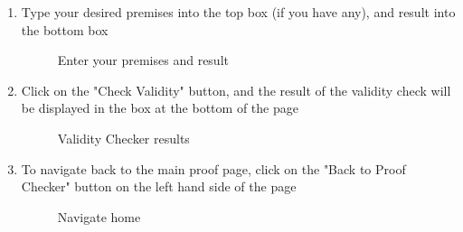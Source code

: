 \begin{enumerate}
	\item Type your desired premises into the top box (if you have any), and result into the bottom box
	
	\begin{figure}[!ht]
		\centering
		\caption{Enter your premises and result}
	\end{figure}

	\item Click on the "Check Validity" button, and the result of the validity check will be displayed in the box at the bottom of the page
	
	\begin{figure}[!ht]
		\centering
		\caption{Validity Checker results}
	\end{figure}

	\item To navigate back to the main proof page, click on the "Back to Proof Checker" button on the left hand side of the page
	
	\begin{figure}[!ht]
		\centering
		\caption{Navigate home}
	\end{figure}
\end{enumerate}

